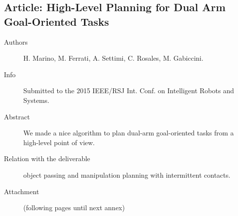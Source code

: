 \documentclass[a4paper,11pt,pdf]{pacmanreport}
\begin{document}
%

\subsection{Article: High-Level Planning for Dual Arm Goal-Oriented Tasks} \label{ann:dualArmPlanning}
\begin{description}
    \item[Authors] H. Marino, M. Ferrati, A. Settimi, C. Rosales, M. Gabiccini.
    \item[Info] Submitted to the 2015 IEEE/RSJ Int. Conf. on Intelligent Robots and Systems.
    \item[Abstract] We made a nice algorithm to plan dual-arm goal-oriented tasks from a high-level point of view.
    \item[Relation with the deliverable] object passing and manipulation planning with intermittent contacts.
    \item[Attachment] (following pages until next annex)
\end{description}
%
\end{document}
